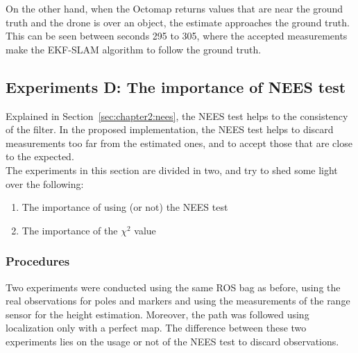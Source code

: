On the other hand, when the Octomap returns values that are near the ground truth and the drone is over an object, the estimate approaches the ground truth. This can be seen between seconds 295 to 305, where the accepted measurements make the EKF-SLAM algorithm to follow the ground truth.

\subsection{Experiments D: The importance of NEES test}
\label{subsec:chapter3:simulation:d}
Explained in Section~\ref{sec:chapter2:nees}, the \ac{NEES} test helps to the consistency of the filter. In the proposed implementation, the \ac{NEES} test helps to discard measurements too far from the estimated ones, and to accept those that are close to the expected.\\

The experiments in this section are divided in two, and try to shed some light over the following:
\begin{enumerate}
    \item{The importance of using (or not) the \ac{NEES} test}
    \item{The importance of the $\chi^2$ value}
\end{enumerate}

\subsubsection{Procedures}
\label{subsubsec:chapter3:simulation:d:procedures}
Two experiments were conducted using the same \ac{ROS} bag as before, using the real observations for poles and markers and using the measurements of the range sensor for the height estimation. Moreover, the path was followed using localization only with a perfect map. The difference between these two experiments lies on the usage or not of the \ac{NEES} test to discard observations.

